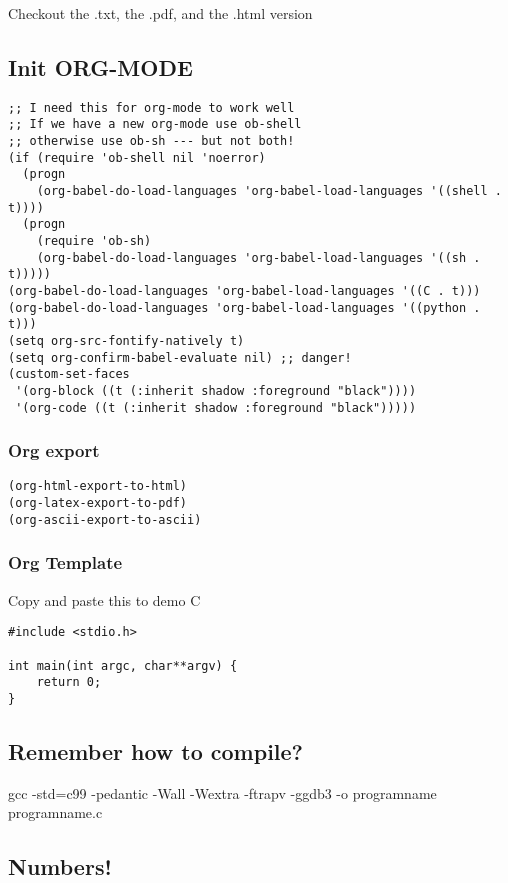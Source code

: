 \documentclass[11pt]{article}
\begin{document}
Checkout the .txt, the .pdf, and the .html version

\subsection{Init ORG-MODE}
\label{sec:org1d93344}

\begin{verbatim}
;; I need this for org-mode to work well
;; If we have a new org-mode use ob-shell
;; otherwise use ob-sh --- but not both!
(if (require 'ob-shell nil 'noerror)
  (progn
    (org-babel-do-load-languages 'org-babel-load-languages '((shell . t))))
  (progn
    (require 'ob-sh)
    (org-babel-do-load-languages 'org-babel-load-languages '((sh . t)))))
(org-babel-do-load-languages 'org-babel-load-languages '((C . t)))
(org-babel-do-load-languages 'org-babel-load-languages '((python . t)))
(setq org-src-fontify-natively t)
(setq org-confirm-babel-evaluate nil) ;; danger!
(custom-set-faces
 '(org-block ((t (:inherit shadow :foreground "black"))))
 '(org-code ((t (:inherit shadow :foreground "black")))))
\end{verbatim}

\subsubsection{Org export}
\label{sec:org41ba130}
\begin{verbatim}
(org-html-export-to-html)
(org-latex-export-to-pdf)
(org-ascii-export-to-ascii)
\end{verbatim}


\subsubsection{Org Template}
\label{sec:org5c84f72}
Copy and paste this to demo C

\begin{verbatim}
#include <stdio.h>

int main(int argc, char**argv) {
    return 0;
}
\end{verbatim}

\subsection{Remember how to compile?}
\label{sec:org5f86ca1}

gcc  -std=c99 -pedantic -Wall -Wextra -ftrapv -ggdb3 -o programname programname.c

\subsection{Numbers!}
\label{sec:org9c052d9}
\end{document}
